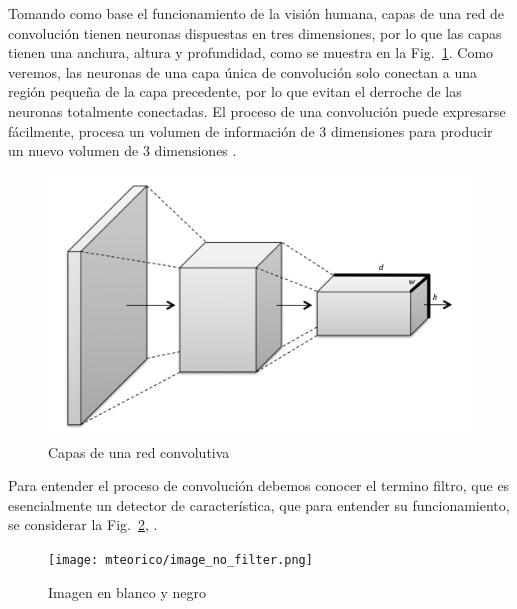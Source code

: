     Tomando como base el funcionamiento de la visión humana, capas de una red de convolución tienen neuronas dispuestas en tres dimensiones, por lo que las capas tienen una anchura, altura y profundidad, como se muestra en la Fig.~\ref{fig:convnet_scheme}. Como veremos, las neuronas de una capa única de convolución solo conectan a una región pequeña de la capa precedente, por lo que evitan el derroche de las neuronas totalmente conectadas. El proceso de una convolución puede expresarse fácilmente, procesa un volumen de información de 3 dimensiones para producir un nuevo volumen de 3 dimensiones \cite{dlBook}.
    \begin{figure}[htp]
        \centering
        \includegraphics[scale=0.32]{chapter3/convnet_scheme.png}
        \caption{Capas de una red convolutiva}
        \label{fig:convnet_scheme}
    \end{figure}

    Para entender el proceso de convolución debemos conocer el termino filtro, que es esencialmente un detector de característica, que para entender su funcionamiento, se considerar la Fig.~\ref{fig:image_no_filter}, \cite{dlBook}.
    \begin{figure}[htp]
        \centering
        \texttt{[image: mteorico/image\_no\_filter.png]}
        \caption{Imagen en blanco y negro}
        \label{fig:image_no_filter}
    \end{figure}

